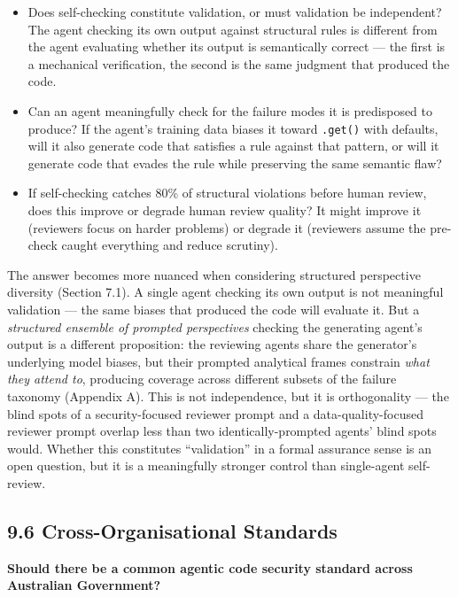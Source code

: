 \documentclass[a4paper,11pt]{report}
\providecommand{\tightlist}{%
  \setlength{\itemsep}{0pt}\setlength{\parskip}{0pt}}
\begin{document}
\begin{itemize}
\tightlist
\item
  Does self-checking constitute validation, or must validation be
  independent? The agent checking its own output against structural
  rules is different from the agent evaluating whether its output is
  semantically correct --- the first is a mechanical verification, the
  second is the same judgment that produced the code.
\item
  Can an agent meaningfully check for the failure modes it is
  predisposed to produce? If the agent's training data biases it toward
  \texttt{.get()} with defaults, will it also generate code that
  satisfies a rule against that pattern, or will it generate code that
  evades the rule while preserving the same semantic flaw?
\item
  If self-checking catches 80\% of structural violations before human
  review, does this improve or degrade human review quality? It might
  improve it (reviewers focus on harder problems) or degrade it
  (reviewers assume the pre-check caught everything and reduce
  scrutiny).
\end{itemize}

The answer becomes more nuanced when considering structured perspective
diversity (Section 7.1). A single agent checking its own output is not
meaningful validation --- the same biases that produced the code will
evaluate it. But a \emph{structured ensemble of prompted perspectives}
checking the generating agent's output is a different proposition: the
reviewing agents share the generator's underlying model biases, but
their prompted analytical frames constrain \emph{what they attend to},
producing coverage across different subsets of the failure taxonomy
(Appendix A). This is not independence, but it is orthogonality --- the
blind spots of a security-focused reviewer prompt and a
data-quality-focused reviewer prompt overlap less than two
identically-prompted agents' blind spots would. Whether this constitutes
``validation'' in a formal assurance sense is an open question, but it
is a meaningfully stronger control than single-agent self-review.

\hypertarget{cross-organisational-standards}{%
\subsection{9.6 Cross-Organisational
Standards}\label{cross-organisational-standards}}

\textbf{Should there be a common agentic code security standard across
Australian Government?}
\end{document}
